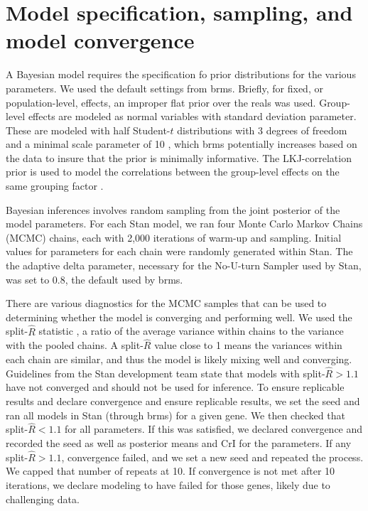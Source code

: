 \documentclass[12pt]{extarticle}
\begin{document}
\section*{Model specification, sampling, and model convergence}

A Bayesian model requires the specification fo prior distributions for the various parameters. We used the default settings from brms. Briefly, for fixed, or population-level, effects, an improper flat prior over the reals was used. Group-level effects are modeled as normal variables with standard deviation parameter. These are modeled with half Student-$t$ distributions with 3 degrees of freedom and a minimal scale parameter of 10 \cite{Gelman2006}, which brms potentially increases based on the data to insure that the prior is minimally informative. The LKJ-correlation prior is used to model the correlations between the group-level effects on the same grouping factor \cite{Lewandowski2009}.

Bayesian inferences involves random sampling from the joint posterior of the model parameters. For each Stan model, we ran four Monte Carlo Markov Chains (MCMC) chains, each with 2,000 iterations of warm-up and sampling. Initial values for parameters for each chain were randomly generated within Stan. The the adaptive delta parameter, necessary for the No-U-turn Sampler \cite{Hoffman2014} used by Stan, was set to 0.8, the default used by brms.

There are various diagnostics for the MCMC samples that can be used to determining whether the model is converging and performing well. We used the split-$\widehat{R}$ statistic \cite{Gelman2013}, a ratio of the average variance within chains to the variance with the pooled chains. A split-$\widehat{R}$ value close to 1 means the variances within each chain are similar, and thus the model is likely mixing well and converging. Guidelines from the Stan development team state that models with split-$\widehat{R} > 1.1$ have not converged and should not be used for inference. To ensure replicable results and declare convergence and ensure replicable results, we set the seed and ran all models in Stan (through brms) for a given gene. We then checked that split-$\widehat{R} < 1.1$ for all parameters. If this was satisfied, we declared convergence and recorded the seed as well as posterior means and CrI for the parameters. If any split-$\widehat{R} > 1.1$, convergence failed, and we set a new seed and repeated the process. We capped that number of repeats at 10. If convergence is not met after 10 iterations, we declare modeling to have failed for those genes, likely due to challenging data.



\end{document}
